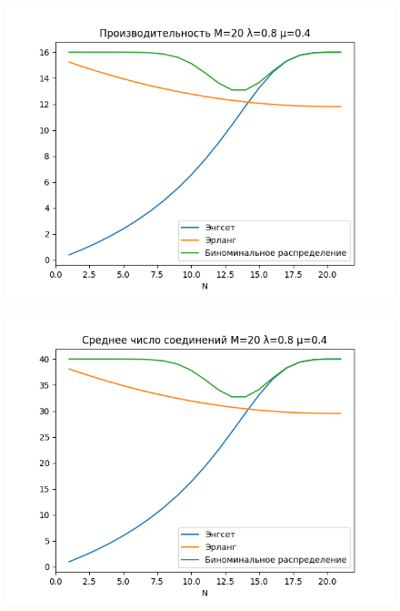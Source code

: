 \documentclass[12pt]{article}
\begin{document}
\begin{figure}[!htb]
\centering
\includegraphics[scale=1.00]{assets/iss_4/perf_M20_lam08_mu04.png}
\caption{}
\label{}
\end{figure}

\begin{figure}[!htb]
\centering
\includegraphics[scale=1.00]{assets/iss_4/aver_conn_M20_lam08_mu04.png}
\caption{}
\label{}
\end{figure}
\end{document}
